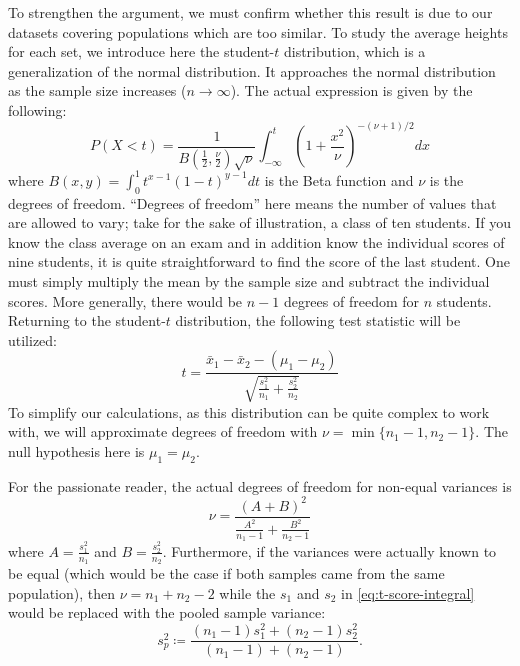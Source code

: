 To strengthen the argument, we must confirm whether this result is due to our datasets covering populations which are too similar.
To study the average heights for each set, we introduce here the student-$t$ distribution, which is a generalization of the normal distribution.
It approaches the normal distribution as the sample size increases ($n\rightarrow{\infty}$).
The actual expression is given by the following:
\begin{equation}
P(X<t)=\frac{1}{B(\frac{1}{2},\frac{\nu}{2})\sqrt{\nu}}\int_{-\infty}^t(1+\frac{x^2}{\nu})^{-(\nu+1)/2}dx
\label{eq:t-score-integral}
\end{equation}
where $B(x,y)=\int_0^1 t^{x-1}(1-t)^{y-1}dt$ is the Beta function and $\nu$ is the degrees of freedom.
``Degrees of freedom'' here means the number of values that are allowed to vary; take for the sake of illustration, a class of ten students.
If you know the class average on an exam and in addition know the individual scores of nine students, it is quite straightforward to find the score of the last student.
One must simply multiply the mean by the sample size and subtract the individual scores.
More generally, there would be $n-1$ degrees of freedom for $n$ students.
Returning to the student-$t$ distribution, the following test statistic will be utilized:
\begin{equation}
t=\frac{\bar{x}_1-\bar{x}_2-(\mu_1-\mu_2)}{\sqrt{\frac{s_1^2}{n_1}+\frac{s_2^2}{n_2}}}
\label{eq:comparing-heights-by-sex-across-datasets-t-test}
\end{equation}
To simplify our calculations, as this distribution can be quite complex to work with, we will approximate degrees of freedom with $\nu=\min\{n_1-1,n_2-1\}$.
The null hypothesis here is $\mu_1=\mu_2$.

For the passionate reader, the actual degrees of freedom for non-equal variances is
\begin{equation}
\nu=\frac{(A+B)^2}{\frac{A^2}{n_1-1}+\frac{B^2}{n_2-1}}
\label{eq:degrees-of-freedom-for-nonequal-variances}
\end{equation}
where $A=\frac{s_1^2}{n_1}$ and $B=\frac{s_2^2}{n_2}$.
Furthermore, if the variances were actually known to be equal (which would be the case if both samples came from the same population), then $\nu=n_1+n_2-2$ while the $s_1$ and $s_2$ in \eqref{eq:t-score-integral} would be replaced with the pooled sample variance:
\begin{equation}
    s_p^2\coloneqq\frac{(n_1-1)s_1^2+(n_2-1)s_2^2}{(n_1-1)+(n_2-1)}.
    \label{eq:pooled-sample-variance}
\end{equation}

